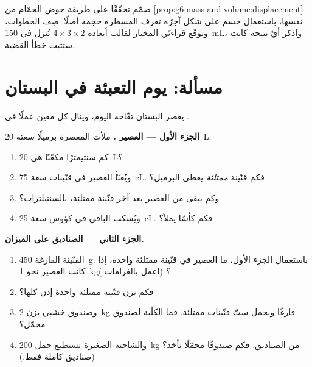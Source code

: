 \begin{exercise}[$\star\star\star$]\label{exo:g6:mass-and-volume:12}
صمّم تحقّقًا على طريقة حوض الحمّام من
\cref{prop:g6:mass-and-volume:displacement} نفسها، باستعمال جسم
على شكل آجرّة تعرف المسطرة حجمه أصلًا. صِف الخطوات، وتوقّع
قراءتَي المخبار لقالب أبعاده $4 \times 3 \times 2$ 
يُنزل في \qty{150}{mL}، واذكر أيّ نتيجة كانت ستثبت خطأ
القضية.
\end{exercise}

\section{مسألة: يوم التعبئة في البستان}

\begin{problem}\label{pb:g6:mass-and-volume:1}
يعصر البستان تفّاحه اليوم، وينال كل معين عملًا في .

\medskip\noindent\textbf{الجزء الأول --- العصير .}
ملأت المعصرة برميلًا سعته \qty{20}{L}.
\begin{enumerate}
  \item كم سنتيمترًا مكعّبًا هي \qty{20}{L}؟
  \item ويُعبّأ العصير في قنّينات سعة \qty{75}{cL}. فكم قنّينة
        \emph{ممتلئة} يعطي البرميل؟
  \item وكم يبقى من العصير بعد آخر قنّينة ممتلئة، بالسنتيلترات؟
  \item ويُسكب الباقي في كؤوس سعة \qty{25}{cL}. فكم كأسًا
        يملأ؟
\end{enumerate}

\medskip\noindent\textbf{الجزء الثاني --- الصناديق على
الميزان.}
\begin{enumerate}[resume]
  \item {} القنّينة الفارغة \qty{450}{g}. باستعمال الجزء
        الأول، ما  العصير في قنّينة ممتلئة واحدة، إذا كانت
          العصير نحو \qty{1}{kg}؟ (اعمل بالغرامات.)
  \item فكم تزن قنّينة ممتلئة واحدة إذن كلها؟
  \item وصندوق خشبي يزن \qty{2}{kg} فارغًا ويحمل ستّ قنّينات
        ممتلئة. فما  الكلّية لصندوق محمّل؟
  \item والشاحنة الصغيرة تستطيع حمل \qty{200}{kg} من الصناديق.
        فكم صندوقًا محمّلًا تأخذ؟ (صناديق كاملة فقط.)
\end{enumerate}


\end{problem}
